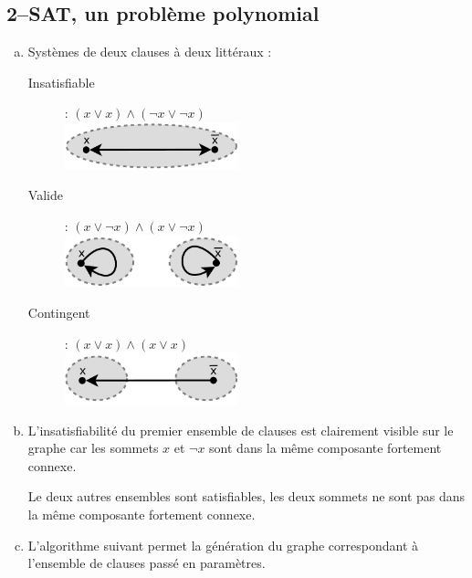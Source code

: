 \subsection{2--SAT, un problème polynomial}
\begin{enumerate}[(a)]
\item Systèmes de deux clauses à deux littéraux :
\begin{description}
\item[Insatisfiable] : $(x \vee x) \wedge (\neg x \vee \neg x)$ \\
\includegraphics[width=5cm]{files/g1ex3.pdf}
\item[Valide] : $(x \vee \neg x) \wedge (x \vee \neg x)$ \\
\includegraphics[width=5cm]{files/g2ex3.pdf}
\item[Contingent] : $(x \vee x) \wedge (x \vee x)$ \\
\includegraphics[width=5cm]{files/g3ex3.pdf}
\end{description}
\item 

L'insatisfiabilité du premier ensemble de clauses est clairement visible sur le graphe car les sommets $x$ et $\neg x$ sont dans la même composante fortement connexe.

Le deux autres ensembles sont satisfiables, les deux sommets ne sont pas dans la même composante fortement connexe.

\item L'algorithme suivant permet la génération du graphe correspondant à l'ensemble de clauses passé en paramètres.


\end{enumerate}
